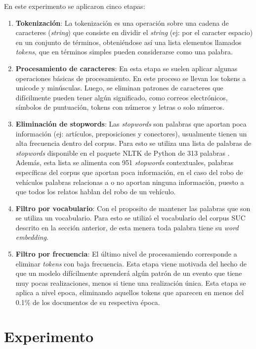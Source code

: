 \documentclass[letterpaper,12pt,oneside]{book} %
\begin{document}
En este experimento se aplicaron cinco etapas:
\begin{enumerate}
\item \textbf{Tokenización}: La tokenización es una operación sobre una cadena de caracteres (\textit{string}) que consiste en dividir el \textit{string} (ej: por el caracter espacio) en un conjunto de términos, obteniéndose así una lista elementos llamados \textit{tokens}, que en términos simples pueden considerarse como una palabra.
\item \textbf{Procesamiento de caracteres}: En esta etapa se suelen aplicar algunas operaciones básicas de procesamiento. En este proceso se llevan los tokens a unicode y minúsculas. Luego, se eliminan patrones de caracteres que difícilmente pueden tener algún significado, como correos electrónicos, símbolos de puntuación, tokens con números y letras o solo números. 
\item \textbf{Eliminación de stopwords}: Las \textit{stopwords} \citep{wilbur1992automatic} son palabras que aportan poca información (ej: artículos, preposiciones y conectores), usualmente tienen un alta frecuencia dentro del corpus. Para esto se utiliza una lista de palabras de \textit{stopwords} disponible en el paquete NLTK de Python de 313 palabras \citep{bird2009natural}. Además, esta lista se alimenta con 951 \textit{stopwords} contextuales, palabras específicas del corpus que aportan poca información, en el caso del robo de vehículos palabras relacionas a  o  no aportan ninguna información, puesto a que todos los relatos hablan del robo de un vehículo. 
\item \textbf{Filtro por vocabulario}: Con el proposito de mantener las palabras que son  se utiliza un vocabulario. Para esto se utilizó el vocabulario del corpus SUC descrito en la sección anterior, de esta menera toda palabra tiene su \textit{word embedding}. 
\item \textbf{Filtro por frecuencia}: El último nivel de procesamiendo corresponde a eliminar \textit{tokens} con baja frecuencia. Esta etapa viene motivada del hecho de que un modelo difícilmente aprenderá algún patrón de un evento que tiene muy pocas realizaciones, menos si tiene una realización única. Esta etapa se aplica a nivel epoca, eliminando aquellos tokens que aparecen en menos del 0.1\% de los documentos de su respectiva época.
\end{enumerate}


\chapter{Experimento}
\end{document}
